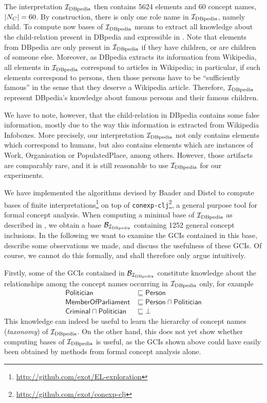 The interpretation ${\mathcal{I}_{\text{DBpedia}}}$ then contains 5624 elements and 60 concept names, \ie
$\lvert N_C \rvert = 60$.  By construction, there is only one role name in ${\mathcal{I}_{\text{DBpedia}}}$, namely
\textsf{child}.  To compute now bases of ${\mathcal{I}_{\text{DBpedia}}}$ means to extract all knowledge about
the child-relation present in DBpedia and expressible in \ELbot.  Note that elements from
DBpedia are only present in ${\mathcal{I}_{\text{DBpedia}}}$ if they have children, or are children of someone
else.  Moreover, as DBpedia extracts its information from Wikipedia, all elements in
${\mathcal{I}_{\text{DBpedia}}}$ correspond to articles in Wikipedia; in particular, if such elements
correspond to persons, then those persons have to be \enquote{sufficiently famous} in the
sense that they deserve a Wikipedia article.  Therefore, ${\mathcal{I}_{\text{DBpedia}}}$ represent DBpedia's
knowledge about famous persons and their famous children.

We have to note, however, that the \textsf{child}-relation in DBpedia contains some false
information, mostly due to the way this information is extracted from Wikipedia Infoboxes.
More precisely, our interpretation ${\mathcal{I}_{\text{DBpedia}}}$ not only contains elements which correspond
to humans, but also contains elements which are instances of \textsf{Work},
\textsf{Organisation} or \textsf{PopulatedPlace}, among others.  However, those artifacts
are comparably rare, and it is still reasonable to use ${\mathcal{I}_{\text{DBpedia}}}$ for our experiments.

We have implemented the algorithms devised by Baader and Distel to compute bases of finite
interpretations\footnote{\url{http://github.com/exot/EL-exploration}} on top of
\texttt{conexp-clj}\footnote{\url{http://github.com/exot/conexp-clj}}, a general purpose
tool for formal concept analysis.  When computing a minimal base of ${\mathcal{I}_{\text{DBpedia}}}$ as
described in , we obtain a base $\mathcal{B}_{{\mathcal{I}_{\text{DBpedia}}}}$ containing
1252 general concept inclusions.  In the following we want to examine the GCIs contained
in this base, describe some observations we made, and discuss the usefulness of these
GCIs.  Of course, we cannot do this formally, and shall therefore only argue intuitively.

Firstly, some of the GCIs contained in $\mathcal{B}_{\mathcal{I}_{\text{DBpedia}}}$ constitute knowledge about
the relationships among the concept names occurring in ${\mathcal{I}_{\text{DBpedia}}}$ only, for example
\begin{align*}
  \mathsf{Politician} &\sqsubseteq \mathsf{Person} \\
  \mathsf{MemberOfParliament} &\sqsubseteq \mathsf{Person \sqcap Politician} \\
  \mathsf{Criminal \sqcap Politician} &\sqsubseteq \bot
\end{align*}
This knowledge can indeed be useful to learn the hierarchy of concept names
(\emph{taxonomy}) of ${\mathcal{I}_{\text{DBpedia}}}$.  On the other hand, this does not yet show whether
computing bases of ${\mathcal{I}_{\text{DBpedia}}}$ is useful, as the GCIs shown above could have easily been
obtained by methods from formal concept analysis alone.

